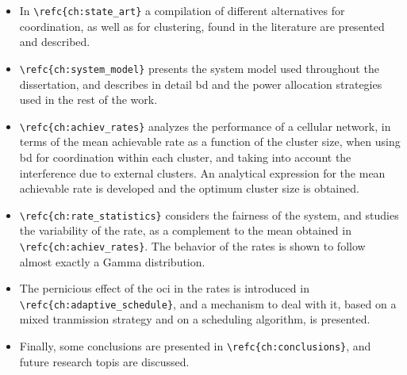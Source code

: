 \begin{itemize}
    \item In \verb+\refc{ch:state_art}+ a compilation of different alternatives for
        coordination, as well as for clustering, found in the literature are
        presented and described.
    \item \verb+\refc{ch:system_model}+ presents the system model used throughout the
        dissertation, and describes in detail \gls{bd} and the power allocation
        strategies used in the rest of the work.
    \item \verb+\refc{ch:achiev_rates}+ analyzes the performance of a cellular network,
        in terms of the mean achievable rate as a function of the cluster size,
        when using \gls{bd} for coordination within each cluster, and taking
        into account the interference due to external clusters. An analytical
        expression for the mean achievable rate is developed and the optimum
        cluster size is obtained.
    \item \verb+\refc{ch:rate_statistics}+ considers the fairness of the system, and
        studies the variability of the rate, as a complement to the mean
        obtained in \verb+\refc{ch:achiev_rates}+. The behavior of the rates is shown
        to follow almost exactly a Gamma distribution.
    \item The pernicious effect of the \gls{oci} in the rates is introduced in
        \verb+\refc{ch:adaptive_schedule}+, and a mechanism to deal with it, based on
        a mixed tranmission strategy and on a scheduling algorithm, is
        presented.
    \item Finally, some conclusions are presented in \verb+\refc{ch:conclusions}+, and
        future research topis are discussed.
\end{itemize}
